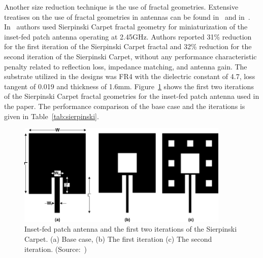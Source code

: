 \documentclass[12pt, oneandhalf, chaparabic, sees, ms]{metu}
\begin{document}
Another size reduction technique is the use of fractal geometries. Extensive treatises on the use of fractal geometries in antennas
can be found in~\cite{vinoy2002} and in~\cite{werner2000frontiers}.
In~\cite{shrestha2013} authors used Sierpinski Carpet fractal geometry for miniaturization of the inset-fed patch antenna operating at 2.45GHz.
Authors reported 31\% reduction for the first iteration of the Sierpinski Carpet fractal and 32\% reduction for the second iteration of the Sierpinski Carpet, 
without any performance characteristic penalty related to reflection loss, impedance matching, and antenna gain. The substrate utilized in the 
designs was FR4 with the dielectric constant of 4.7, loss tangent of 0.019 and thickness of 1.6mm.
Figure~\ref{fig:sierpinski} shows the first two iterations of the Sierpinski Carpet fractal geometries for the inset-fed patch antenna used in the paper.
The performance comparison of the base case and the iterations is given in Table~\ref{tab:sierpinski}.
\vspace{1cm}
%
%
%
\begin{figure}[!htbp]
 \begin{center}
  \includegraphics[width=0.9\textwidth]{sierpinski-iters.png}
 \end{center}
 \caption{Inset-fed patch antenna and the first two iterations of the Sierpinski Carpet. (a) Base case, (b) The first iteration  (c) The second iteration. (Source:~\protect\cite{shrestha2013})}
  \label{fig:sierpinski}
\end{figure}
% 
%
%
\end{document}
